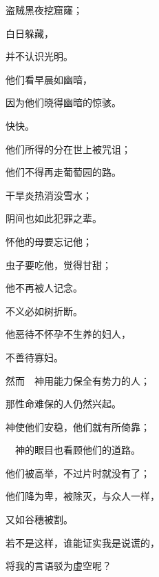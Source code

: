 {\par }{\Q {}盗贼黑夜挖窟窿；
\par }{\Q 白日躲藏，
\par }{\Q 并不认识光明。
\par }{\Q {}他们看早晨如幽暗，
\par }{\Q 因为他们晓得幽暗的惊骇。
\par }{\BB \par }{\Q {}快快{}。
\par }{\Q 他们所得的分在世上被咒诅；
\par }{\Q 他们不得再走葡萄园的路。
\par }{\Q {}干旱炎热消没雪水；
\par }{\Q 阴间也如此{}犯罪之辈。
\par }{\Q {}怀他的母要忘记他；
\par }{\Q 虫子要吃他，觉得甘甜；
\par }{\Q 他不再被人记念。
\par }{\Q 不义{}必如树折断。
\par }{\BB \par }{\Q {}他恶待不怀孕不生养的妇人，
\par }{\Q 不善待寡妇。
\par }{\Q {}然而　神用能力保全有势力的人；
\par }{\Q 那性命难保的人仍然兴起。
\par }{\Q {}神使他们安稳，他们就有所倚靠；
\par }{\Q 　神的眼目也看顾他们的道路。
\par }{\Q {}他们被高举，不过片时就没有了；
\par }{\Q 他们降为卑，被除灭，与众人一样，
\par }{\Q 又如谷穗被割。
\par }{\Q {}若不是这样，谁能证实我是说谎的，
\par }{\Q 将我的言语驳为虚空呢？

\par }
